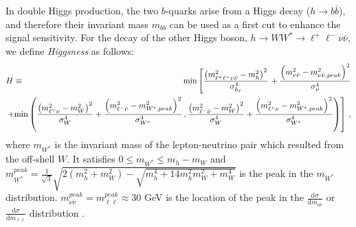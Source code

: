 In double Higgs production, the two $b$-quarks arise from a Higgs decay ($h \to b \bar b$), and therefore their invariant mass $m_{bb}$
can be used as a first cut to enhance the signal sensitivity. 
For the decay of the other Higgs boson, $h \to W W^* \to \ell^+ \ell^- \nu \bar\nu$, we define {\it Higgsness} \cite{Kim:2018cxf} as follows: 
%
\begin{eqnarray}
H &\equiv&    {\rm min} \left [
 \frac{\left ( m^2_{\ell^+\ell^-\nu \bar\nu} - m^2_h \right )^2}{\sigma_{h_\ell}^4}    \right. 
 + \frac{ \left ( m_{\nu  \bar\nu}^2 -  m_{\nu\bar\nu, peak}^2 \right )^2}{ \sigma^4_{\nu}}
 \label{eq:hww}   \\
 && \hspace*{-1cm}  \left. + {\min} \left ( 
\frac{\left ( m^2_{\ell^+ \nu } - m^2_W \right )^2}{\sigma_W^4} + 
\frac{\left ( m^2_{\ell^- \bar \nu} - m^2_{W^*, peak} \right )^2}{\sigma_{W^*}^4}  \, , 
\frac{\left ( m^2_{\ell^- \bar \nu} - m^2_W \right )^2}{\sigma_W^4} + 
\frac{\left ( m^2_{\ell^+ \nu} - m^2_{W^*, peak} \right )^2}{\sigma_{W^*}^4}  
\right )  \right ]   \, , \nonumber
\end{eqnarray}
%
%
where $m_{W^*}$ is the invariant mass of the lepton-neutrino pair which resulted from the off-shell $W$. 
It satisfies $0 \leq m_{W^*} \leq m_h- m_W$ and $m_{W^*}^{peak} = \frac{1}{\sqrt{3}} \sqrt{ 2 \left ( m_h^2 + m_W^2 \right ) - \sqrt{m_h^4 + 14 m_h^2 m_W^2 + m_W^4}}$ is the peak in the $m_{W^*}$ distribution.
$m_{\nu\bar\nu}^{peak} = m_{\ell\ell}^{peak} \approx 30$ GeV is the location of the peak in the $\frac{\textrm{d}\sigma}{\textrm{d} m_{\nu\bar\nu}}$ or $\frac{\textrm{d}\sigma}{\textrm{d} m_{\ell\ell}}$ distribution \cite{Kim:2018cxf,Cho:2012er}.
%
%
%
%
%
%

